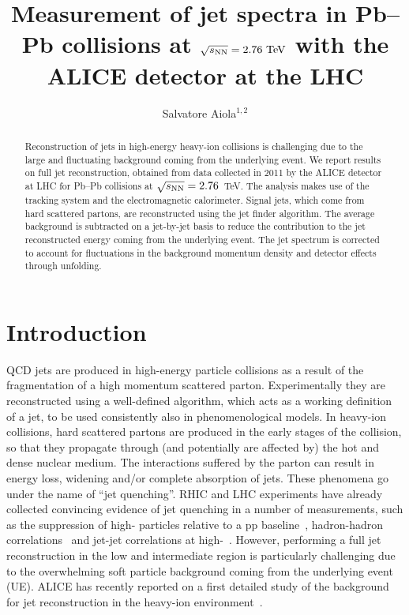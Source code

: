 \documentclass[a4paper]{jpconf}
\begin{document}
\title{Measurement of jet \pT{} spectra in Pb--Pb collisions at $\sqrt{s_{\rm NN}}=2.76~\mathrm{TeV}$ with the ALICE detector at the LHC}

\author{Salvatore Aiola$^{1,2}$}

\address{$^1$ University of Catania and INFN Sezione di Catania,  95123 Catania, Italy}
\address{$^2$ Lawrence Berkeley National Laboratory, Berkeley, CA 94720}


\begin{abstract}
Reconstruction of jets in high-energy heavy-ion collisions is challenging due to the large and fluctuating
background coming from the underlying event. We report results on full jet reconstruction, 
obtained from data collected in 2011 by the ALICE detector at LHC for \mbox{Pb--Pb} collisions 
at $\sqrt{s_{\rm NN}}=2.76$~TeV. The analysis makes use of the tracking system and the electromagnetic calorimeter.
Signal jets, which come from hard scattered partons, are reconstructed using the \antikt{} jet finder algorithm. 
The average background is subtracted on a jet-by-jet basis to 
reduce the contribution to the jet reconstructed energy coming from the underlying event. The jet spectrum 
is corrected to account for fluctuations in the background momentum density and detector effects through 
unfolding.
\end{abstract}

\section{Introduction}
QCD jets are produced in high-energy particle collisions as a result of the fragmentation of a high momentum scattered parton.
Experimentally they are reconstructed using a well-defined algorithm, which acts as a working definition of a jet, to be used
consistently also in phenomenological models.
In heavy-ion collisions, hard 
scattered partons are produced in the early stages of the collision, so that they propagate through 
(and potentially are affected by) the hot and dense nuclear medium. The interactions suffered by 
the parton can result in energy loss, widening and/or complete absorption of jets. These phenomena go under the name
of ``jet quenching''.
RHIC and LHC experiments have already collected convincing evidence of jet quenching in a 
number of measurements, such as the suppression
of high-\pT{} particles relative to a pp baseline~\cite{hadrons-star-03,hadrons-phenix-04,hadrons-alice-10,hadrons-cms-12}, 
hadron-hadron correlations~\cite{dijet-star-06,dijet-alice-12}
and jet-jet correlations at high-\pT{}~\cite{dijet-atlas-10,jet-cms-11}. However, performing
a full jet reconstruction in the low and intermediate \pT{} region is particularly challenging due to the overwhelming soft particle background 
coming from the underlying event (UE). ALICE has recently reported
on a first detailed study of the background for jet reconstruction in the heavy-ion environment~\cite{bkg-alice-12}.
\end{document}
